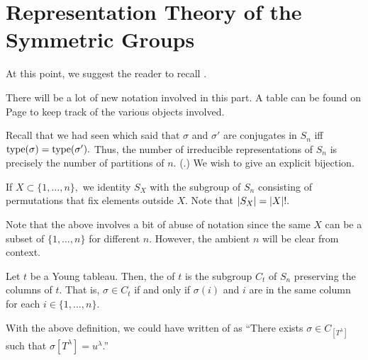 \section{Representation Theory of the Symmetric Groups} \label{sec:06}

At this point, we suggest the reader to recall .

There will be a lot of new notation involved in this part. A table can be found on Page \pageref{bookkeeping} to keep track of the various objects involved.

\begin{rem} \label{rem:irredrepsconjclassSn}
	Recall that we had seen  which said that $\sigma$ and $\sigma'$ are conjugates in $S_n$ iff $\operatorname{type}(\sigma) = \operatorname{type}(\sigma').$ Thus, the number of irreducible representations of $S_n$ is precisely the number of partitions of $n.$ (.) We wish to give an explicit bijection.
\end{rem}

\begin{defn}%
	If $X \subset \{1, \ldots, n\},$ we identity $S_X$ with the subgroup of $S_n$ consisting of permutations that fix elements outside $X.$ Note that ${\left\lvert S_{X} \right\lvert} = {\left\lvert X \right\lvert}!.$
\end{defn}
Note that the above involves a bit of abuse of notation since the same $X$ can be a subset of $\{1, \ldots, n\}$ for different $n.$ However, the ambient $n$ will be clear from context.

\begin{defn}%
	Let $t$ be a Young tableau. Then, the  of $t$ is the subgroup $C_t$ of $S_n$ preserving the columns of $t.$ That is, $\sigma \in C_t$ if and only if $\sigma(i)$ and $i$ are in the same column for each $i \in \{1, \ldots, n\}.$
\end{defn}

With the above definition, we could have written  of  as ``There exists $\sigma \in C_{[T^\lambda]}$ such that $\sigma [T^\lambda] = u^\lambda$.''


